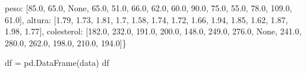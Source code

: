 \documentclass[
  letterpaper,
  DIV=11,
  numbers=noendperiod]{scrreprt}
\newenvironment{Shaded}{\begin{snugshade}}{\end{snugshade}}
\newcommand{\FloatTok}[1]{\textcolor[rgb]{0.68,0.00,0.00}{#1}}
\newcommand{\NormalTok}[1]{\textcolor[rgb]{0.00,0.23,0.31}{#1}}
\newcommand{\OperatorTok}[1]{\textcolor[rgb]{0.37,0.37,0.37}{#1}}
\newcommand{\StringTok}[1]{\textcolor[rgb]{0.13,0.47,0.30}{#1}}
\newcommand{\VariableTok}[1]{\textcolor[rgb]{0.07,0.07,0.07}{#1}}
\begin{document}
\begin{Shaded}
\begin{Highlighting}[]
        \StringTok{\textquotesingle{}peso\textquotesingle{}}\NormalTok{: [}\FloatTok{85.0}\NormalTok{, }\FloatTok{65.0}\NormalTok{, }\VariableTok{None}\NormalTok{, }\FloatTok{65.0}\NormalTok{, }\FloatTok{51.0}\NormalTok{, }\FloatTok{66.0}\NormalTok{, }\FloatTok{62.0}\NormalTok{, }\FloatTok{60.0}\NormalTok{, }\FloatTok{90.0}\NormalTok{, }\FloatTok{75.0}\NormalTok{, }\FloatTok{55.0}\NormalTok{, }\FloatTok{78.0}\NormalTok{, }\FloatTok{109.0}\NormalTok{, }\FloatTok{61.0}\NormalTok{],}
        \StringTok{\textquotesingle{}altura\textquotesingle{}}\NormalTok{: [}\FloatTok{1.79}\NormalTok{, }\FloatTok{1.73}\NormalTok{, }\FloatTok{1.81}\NormalTok{, }\FloatTok{1.7}\NormalTok{, }\FloatTok{1.58}\NormalTok{, }\FloatTok{1.74}\NormalTok{, }\FloatTok{1.72}\NormalTok{, }\FloatTok{1.66}\NormalTok{, }\FloatTok{1.94}\NormalTok{, }\FloatTok{1.85}\NormalTok{, }\FloatTok{1.62}\NormalTok{, }\FloatTok{1.87}\NormalTok{, }\FloatTok{1.98}\NormalTok{, }\FloatTok{1.77}\NormalTok{],}
        \StringTok{\textquotesingle{}colesterol\textquotesingle{}}\NormalTok{: [}\FloatTok{182.0}\NormalTok{, }\FloatTok{232.0}\NormalTok{, }\FloatTok{191.0}\NormalTok{, }\FloatTok{200.0}\NormalTok{, }\FloatTok{148.0}\NormalTok{, }\FloatTok{249.0}\NormalTok{, }\FloatTok{276.0}\NormalTok{, }\VariableTok{None}\NormalTok{, }\FloatTok{241.0}\NormalTok{, }\FloatTok{280.0}\NormalTok{, }\FloatTok{262.0}\NormalTok{, }\FloatTok{198.0}\NormalTok{, }\FloatTok{210.0}\NormalTok{, }\FloatTok{194.0}\NormalTok{]\}}

\NormalTok{df }\OperatorTok{=}\NormalTok{ pd.DataFrame(data)}
\NormalTok{df}
\end{Highlighting}
\end{Shaded}
\end{document}
